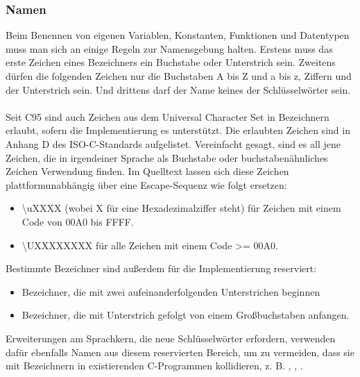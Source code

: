 \subsubsection{Namen}
Beim Benennen von eigenen Variablen, Konstanten, Funktionen und Datentypen muss man sich an einige Regeln zur Namensgebung halten. Erstens muss das erste Zeichen eines Bezeichners ein Buchstabe oder Unterstrich sein. Zweitens dürfen die folgenden Zeichen nur die Buchstaben A bis Z und a bis z, Ziffern und der Unterstrich sein. Und drittens darf der Name keines der Schlüsselwörter sein.\\
\\
Seit C95 sind auch Zeichen aus dem Universal Character Set in Bezeichnern erlaubt, sofern die Implementierung es unterstützt. Die erlaubten Zeichen sind in Anhang D des ISO-C-Standards aufgelistet. Vereinfacht gesagt, sind es all jene Zeichen, die in irgendeiner Sprache als Buchstabe oder buchstabenähnliches Zeichen Verwendung finden. Im Quelltext lassen sich diese Zeichen plattformunabhängig über eine Escape-Sequenz wie folgt ersetzen:
\begin{itemize}
\item \textbackslash uXXXX (wobei X für eine Hexadezimalziffer steht) für Zeichen mit einem Code von 00A0 bis FFFF.
\item \textbackslash UXXXXXXXX für alle Zeichen mit einem Code >= 00A0.
\end{itemize}
Bestimmte Bezeichner sind außerdem für die Implementierung reserviert:
\begin{itemize}
\item Bezeichner, die mit zwei aufeinanderfolgenden Unterstrichen beginnen
\item Bezeichner, die mit Unterstrich gefolgt von einem Großbuchstaben anfangen.
\end{itemize}
Erweiterungen am Sprachkern, die neue Schlüsselwörter erfordern, verwenden dafür ebenfalls Namen aus diesem reservierten Bereich, um zu vermeiden, dass sie mit Bezeichnern in existierenden C-Programmen kollidieren, z. B. , , .
